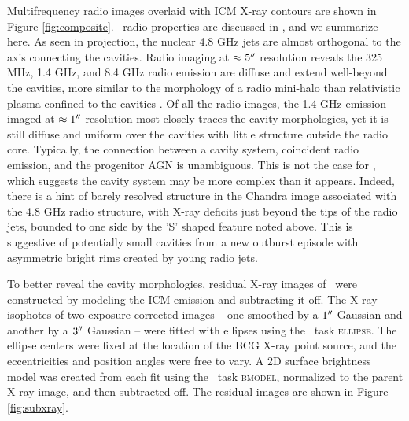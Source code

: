\documentclass[apjpt4]{aastex}
\begin{document}
Multifrequency radio images overlaid with ICM X-ray contours are shown
in Figure \ref{fig:composite}. \rbs\ radio properties are discussed in
\citet{gitti06}, and we summarize here. As seen in projection, the
nuclear 4.8 GHz jets are almost orthogonal to the axis connecting the
cavities. Radio imaging at $\approx 5\rm{^\prime}\hskip -0.1em\rm{^\prime}$ resolution reveals the 325
MHz, 1.4 GHz, and 8.4 GHz radio emission are diffuse and extend
well-beyond the cavities, more similar to the morphology of a radio
mini-halo than relativistic plasma confined to the cavities
\citep[][Doria et al., in preparation]{2008A&A...486L..31C}. Of all
the radio images, the 1.4 GHz emission imaged at $\approx 1 \rm{^\prime}\hskip -0.1em\rm{^\prime}$
resolution most closely traces the cavity morphologies, yet it is
still diffuse and uniform over the cavities with little structure
outside the radio core. Typically, the connection between a cavity
system, coincident radio emission, and the progenitor AGN is
unambiguous. This is not the case for \rbs, which suggests the cavity
system may be more complex than it appears. Indeed, there is a hint of
barely resolved structure in the Chandra image associated with the 4.8
GHz radio structure, with X-ray deficits just beyond the tips of the
radio jets, bounded to one side by the 'S' shaped feature noted
above. This is suggestive of potentially small cavities from a new
outburst episode with asymmetric bright rims created by young radio
jets.

To better reveal the cavity morphologies, residual X-ray images of
\rbs\ were constructed by modeling the ICM emission and subtracting it
off. The X-ray isophotes of two exposure-corrected images -- one
smoothed by a $1\rm{^\prime}\hskip -0.1em\rm{^\prime}$ Gaussian and another by a $3\rm{^\prime}\hskip -0.1em\rm{^\prime}$ Gaussian --
were fitted with ellipses using the \iraf\ task \textsc{ellipse}. The
ellipse centers were fixed at the location of the BCG X-ray point
source, and the eccentricities and position angles were free to
vary. A 2D surface brightness model was created from each fit using
the \iraf\ task \textsc{bmodel}, normalized to the parent X-ray image,
and then subtracted off. The residual images are shown in Figure
\ref{fig:subxray}.
\end{document}
